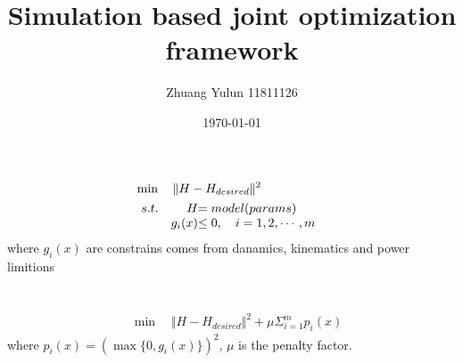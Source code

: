 \documentclass{article}
\title{Simulation based joint optimization framework}
\author{Zhuang Yulun 11811126}
\date{\today}
\begin{document}
\maketitle
\section{}

\begin{align*}
    &\min \quad \Vert H-H_{desired} \Vert^2\\
    &\begin{array}{r@{\quad}r@{}l@{\quad}l}
    s.t.
        &H&=model(params)\\
        &g_i(x)&\leq 0,\quad i=1,2,\cdots,m
    \end{array}
\end{align*}
where $g_i(x)$ are constrains comes from danamics, kinematics and power limitions
\section{}

\begin{align*}
    &\min \quad \Vert H-H_{desired} \Vert^2+\mu\Sigma_{i=1}^mp_i(x)
\end{align*}
where $p_i(x)=(\max\{0,g_i(x)\})^2$, $\mu$ is the penalty factor.
\end{document}
